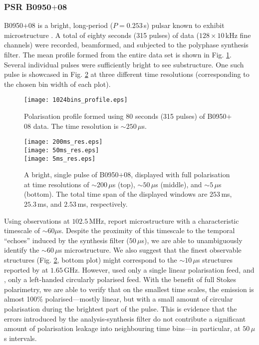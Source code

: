 \documentclass{pasa}%
\newcommand{\psrslowB}{B0950$+$08}
\begin{document}

\subsubsection{PSR \psrslowB{}}

\psrslowB{} is a bright, long-period ($P = 0.253\,$s) pulsar known to exhibit microstructure \citep{Popov2002,Kuzmin2003}.
A total of eighty seconds (315 pulses) of data ($128 \times 10\,$kHz fine channels) were recorded, beamformed, and subjected to the polyphase synthesis filter.
The mean profile formed from the entire data set is shown in Fig. \ref{fig:0950_80_secs}.
Several individual pulses were sufficiently bright to see substructure.
One such pulse is showcased in Fig. \ref{fig:0950_single_pulse} at three different time resolutions (corresponding to the chosen bin width of each plot).

\begin{figure}[t!]
    \centering
    \texttt{[image: 1024bins\_profile.eps]}
    \caption{Polarisation profile formed using 80 seconds (315 pulses) of \psrslowB{} data. The time resolution is $\sim 250\,\mu$s.}
    \label{fig:0950_80_secs}
\end{figure}

\begin{figure}[t!]
    \centering
    \texttt{[image: 200ms\_res.eps]} \\[10pt]
    \texttt{[image: 50ms\_res.eps]} \\[10pt]
    \texttt{[image: 5ms\_res.eps]}
    \caption{A bright, single pulse of \psrslowB{}, displayed with full polarisation at time resolutions of $\sim 200\,\mu$s (top), $\sim 50\,\mu$s (middle), and $\sim 5\,\mu$s (bottom). The total time span of the displayed windows are $253\,$ms, $25.3\,$ms, and $2.53\,$ms, respectively.}
    \label{fig:0950_single_pulse}
\end{figure}

Using observations at $102.5\,$MHz, \citet{Kuzmin2003} report microstructure with a characteristic timescale of $\sim 60\mu$s.
Despite the proximity of this timescale to the temporal ``echoes'' induced by the synthesis filter ($50\,\mu$s), we are able to unambiguously identify the $\sim 60\,\mu$s microstructure.
We also suggest that the finest observable structures (Fig. \ref{fig:0950_single_pulse}, bottom plot) might correspond to the $\sim 10\,\mu$s structures reported by \citet{Popov2002} at $1.65\,$GHz.
However, \citet{Kuzmin2003} used only a single linear polarisation feed, and \citet{Popov2002}, only a left-handed circularly polarised feed.
With the benefit of full Stokes polarimetry, we are able to verify that on the smallest time scales, the emission is almost 100\% polarised---mostly linear, but with a small amount of circular polarisation during the brightest part of the pulse.
This is evidence that the errors introduced by the analysis-synthesis filter do not contribute a significant amount of polarisation leakage into neighbouring time bins---in particular, at $50\,\mu$s intervals.
\end{document}
